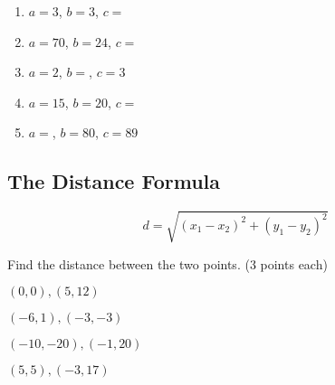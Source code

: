 \documentclass[12pt]{article}
\begin{document}
\begin{enumerate}

	\item $a=3$,\hspace{1in} $b=3$,\hspace{1in} $c=$\underline{\hspace{1in}}\\

	\item $a=70$, \hspace{1in} $b=24$,\hspace{1in} $c=$\underline{\hspace{1in}}\\
	
	\item $a=2$, \hspace{1in}$b=$\underline{\hspace{1in}},\hspace{.5cm} $c=3$\\
	
	\item $a=15$, \hspace{1in}$b=20$, \hspace{1in}$c=$\underline{\hspace{1in}}\\	
	
	\item $a=$\underline{\hspace{1in}}, \hspace{.5cm} $b=80$,\hspace{1in} $c=89$\\
\end{enumerate}


\hrulefill

\subsection*{The Distance Formula}

$$d=\sqrt{(x_{1}-x_{2})^{2}+(y_{1}-y_{2})^{2}}$$

Find the distance between the two points. (3 points each)\\

\begin{enumerate}[resume]
\begin{multicols}{2}

	
	\item $(0,0), (5,12)$\\
		
	\item $(-6,1),(-3,-3)$\\
	
	\item $(-10,-20),(-1,20)$\\

	\item $(5,5),(-3,17)$

\end{multicols}
\end{enumerate}
\end{document}

